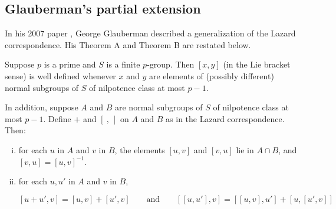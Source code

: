 \subsection{Glauberman's partial extension}

In his 2007 paper \cite{Partialextensions}, George Glauberman described
a generalization of the Lazard correspondence. His Theorem A and
Theorem B are restated below.

\begin{theorem}
  Suppose $p$ is a prime and $S$ is a finite $p$-group. Then $[x,y]$
  (in the Lie bracket sense) is well defined whenever $x$ and $y$ are
  elements of (possibly different) normal subgroups of $S$ of
  nilpotence class at most $p - 1$.

  In addition, suppose $A$ and $B$ are normal subgroups of $S$ of
  nilpotence class at most $p - 1$. Define $+$ and $[ \ , \ ]$ on $A$
  and $B$ as in the Lazard correspondence. Then:

  \begin{enumerate}[(i)]
  \item for each $u$ in $A$ and $v$ in $B$, the elements $[u,v]$ and
    $[v,u]$ lie in $A \cap B$, and $[v,u] = [u,v]^{-1}$.
  \item for each $u,u'$ in $A$ and $v$ in $B$,

    $$[u + u',v] = [u,v] + [u',v] \qquad \text{and} \qquad [[u,u'],v] = [[u,v],u'] + [u,[u',v]]$$
  \end{enumerate}
\end{theorem}

